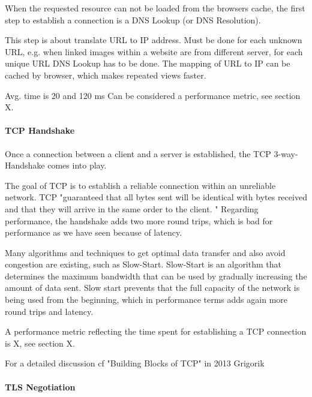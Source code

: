 When the requested resource can not be loaded from the browsers cache, the first step to establish a connection is a DNS Lookup (or DNS Resolution).

This step is about translate URL to IP address.
Must be done for each unknown URL, e.g. when linked images within a website are from different server, for each unique URL DNS Lookup has to be done.
The mapping of URL to IP can be cached by browser, which makes repeated views faster. %

Avg. time is 20 and 120 ms %
Can be considered a performance metric, see section X.




\paragraph{TCP Handshake}

Once a connection between a client and a server is established, the TCP 3-way-Handshake comes into play.

The goal of TCP is to establish a reliable connection within an unreliable network.
TCP  "guaranteed that all bytes sent will be identical with bytes received and that they will arrive in the same order to the client. " %
Regarding performance, the handshake adds two more round trips, which is bad for performance as we have seen because of latency.

Many algorithms and techniques to get optimal data transfer and also avoid congestion are existing, such as Slow-Start.
Slow-Start is an algorithm that determines the maximum bandwidth that can be used by gradually increasing the amount of data sent.
Slow start prevents that the full capacity of the network is being used from the beginning, which in performance terms adds again more round trips and latency. %


A performance metric reflecting the time spent for establishing a TCP connection is X, see section X.

For a detailed discussion cf "Building Blocks of TCP" in 2013 Grigorik %





\paragraph{TLS Negotiation}

